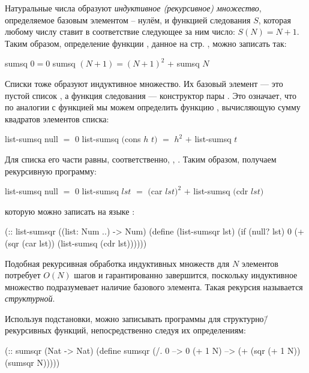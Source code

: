 Натуральные числа образуют \emph{индуктивное (рекурсивное) множество}, определяемое базовым элементом -- нулём, и функцией следования $S$, которая любому числу ставит в соответствие следующее за ним число: $S(N)=N+1$. 
Таким образом, определение функции , данное на стр. \pageref{sumsq}, можно записать так:

\begin{SchemeCode}
  sumsq $0 = 0$
  sumsq $(N + 1) = (N+1)^2$ + sumsq $N$
\end{SchemeCode}

Списки тоже образуют индуктивное множество. Их базовый элемент --- это пустой список , а функция следования --- конструктор пары . 
Это означает, что по аналогии с функцией  мы можем определить функцию , вычисляющую сумму квадратов элементов списка:

\begin{SchemeCode}
  list-sumsq null $=$ $0$
  list-sumsq $($cons $h$ $t)$ $=$ $h^2$ $+$ list-sumsq $t$
\end{SchemeCode}

Для списка  его части равны, соответственно, , . Таким образом, получаем рекурсивную программу:

\begin{SchemeCode}
  list-sumsq null $=$ $0$
  list-sumsq $lst$ $=$ $($car $lst)^2$ $+$ list-sumsq $($cdr $lst)$
\end{SchemeCode}
которую можно записать на языке \Scheme:
\begin{SchemeCode}[emph={lst}]
(:: list-sumsqr ((list: Num ..) -> Num)
  (define (list-sumsqr lst)
    (if (null? lst)
        0
        (+ (sqr (car lst)) (list-sumsq (cdr lst))))))
\end{SchemeCode}

Подобная рекурсивная обработка индуктивных множеств для $N$ элементов потребует $O(N)$ шагов и гарантированно завершится, поскольку индуктивное множество подразумевает наличие базового элемента. Такая рекурсия называется \emph{структурной}.

%
Используя подстановки, можно записывать программы для структурно\=/рекурсивных функций, непосредственно следуя их определениям:

\begin{SchemeCode}[emph={N}]
(:: sumsqr (Nat -> Nat)
 (define sumsqr
   (/. 0 --> 0
       (+ 1 N) --> (+ (sqr (+ 1 N)) (sumsqr N)))))
\end{SchemeCode}


